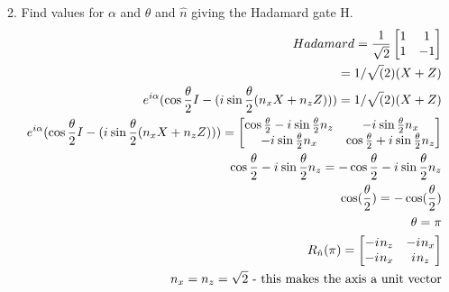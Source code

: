 \documentclass[12pt, letterpaper, twoside]{article}
\newcommand{\iu}{{i\mkern1mu}}
\newcommand{\Hadamard}{\frac{1}{\sqrt{2}}
\begin{bmatrix}
    1 & 1 \\
    1 & -1
\end{bmatrix}}
\newcommand{\halftheta}{\frac{\theta}{2}}
\newcommand{\twoXtwo}[4]{\begin{bmatrix}
    #1 & #3 \\
    #2 & #4
\end{bmatrix}}
\begin{document}
2. Find values for $\alpha$ and $\theta$ and $\hat{n}$ giving the Hadamard gate H.
\begin{subequations}
	\begin{align}
		Hadamard = \Hadamard                                                                                                                                                                                                               \\
		= 1/\sqrt(2) (X + Z)                                                                                                                                                                                                               \\
		e^{i \alpha}(\cos{\halftheta}I - (\iu \sin{\halftheta}(n_x X + n_z Z))) = 1/\sqrt(2) (X + Z)                                                                                                                                       \\
		e^{i \alpha}(\cos{\halftheta}I - (\iu \sin{\halftheta}(n_x X + n_z Z))) = \twoXtwo{\cos{\halftheta} - \iu \sin{\halftheta} n_z}{-\iu \sin{\halftheta} n_x}{-\iu \sin{\halftheta} n_x}{\cos{\halftheta} + \iu \sin{\halftheta} n_z} \\
		\cos{\halftheta} - \iu \sin{\halftheta} n_z = -\cos{\halftheta} - \iu \sin{\halftheta} n_z                                                                                                                                         \\
		\cos(\halftheta) = - \cos(\halftheta)                                                                                                                                                                                              \\
		\theta = \pi                                                                                                                                                                                                                       \\
		R_{\hat{n}}(\pi) = \twoXtwo{- \iu n_z}{-\iu n_x}{-\iu n_x}{\iu n_z}                                                                                                                                                                \\
		n_x = n_z = \sqrt{2} \text{ - this makes the axis a unit vector}                                                                                                                                                                   \\

\end{align}
\end{subequations}
\end{document}
